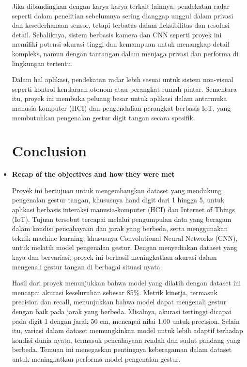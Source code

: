\documentclass[12pt,a4paper]{article}
\begin{document}
\begin{itemize}
    
    \hspace{0.5cm} Jika dibandingkan dengan karya-karya terkait lainnya, pendekatan radar seperti dalam penelitian sebelumnya sering dianggap unggul dalam privasi dan kesederhanaan sensor, tetapi terbatas dalam fleksibilitas dan resolusi detail. Sebaliknya, sistem berbasis kamera dan CNN seperti proyek ini memiliki potensi akurasi tinggi dan kemampuan untuk menangkap detail kompleks, namun dengan tantangan dalam menjaga privasi dan performa di lingkungan tertentu.

    
    \hspace{0.5cm} Dalam hal aplikasi, pendekatan radar lebih sesuai untuk sistem non-visual seperti kontrol kendaraan otonom atau perangkat rumah pintar. Sementara itu, proyek ini membuka peluang besar untuk aplikasi dalam antarmuka manusia-komputer (HCI) dan pengendalian perangkat berbasis IoT, yang membutuhkan pengenalan gestur digit tangan secara spesifik.



\section{\uppercase Conclusion}
\item \textbf{Recap of the objectives and how they were met}
\begin{itemize}
    \hspace{0.5cm} Proyek ini bertujuan untuk mengembangkan dataset yang mendukung pengenalan gestur tangan, khususnya hand digit dari 1 hingga 5, untuk aplikasi berbasis interaksi manusia-komputer (HCI) dan Internet of Things (IoT). Tujuan tersebut tercapai melalui pengumpulan data yang beragam dalam kondisi pencahayaan dan jarak yang berbeda, serta menggunakan teknik machine learning, khususnya Convolutional Neural Networks (CNN), untuk melatih model pengenalan gestur. Dengan menyediakan dataset yang kaya dan bervariasi, proyek ini berhasil meningkatkan akurasi dalam mengenali gestur tangan di berbagai situasi nyata.
    
    \hspace{0.5cm} Hasil dari proyek menunjukkan bahwa model yang dilatih dengan dataset ini mencapai akurasi keseluruhan sebesar 85\%. Metrik kinerja, termasuk precision dan recall, menunjukkan bahwa model dapat mengenali gestur dengan baik pada jarak yang berbeda. Misalnya, akurasi tertinggi dicapai pada digit 1 dengan jarak 50 cm, mencapai nilai 1.00 untuk precision. Selain itu, variasi dalam dataset memungkinkan model untuk lebih adaptif terhadap kondisi dunia nyata, termasuk pencahayaan rendah dan sudut pandang yang berbeda. Temuan ini menegaskan pentingnya keberagaman dalam dataset untuk meningkatkan performa model pengenalan gestur.


\end{itemize}
\end{itemize}
\end{document}
